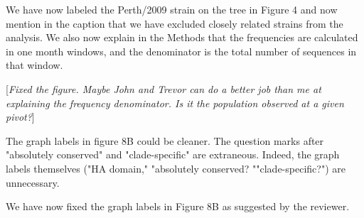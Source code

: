 \documentclass[11pt, oneside]{article}   	%
\newcommand{\comment}[1]{{\color{red}[\textsl{#1}]}}
\newcommand{\response}[1]{{\color{black}#1}}
\begin{document}
\response{We have now labeled the Perth/2009 strain on the tree in Figure 4 and now mention in the caption that we have excluded closely related strains from the analysis.
We also now explain in the Methods that the frequencies are calculated in one month windows, and the denominator is the total number of sequences in that window.
}

\comment{Fixed the figure. Maybe John and Trevor can do a better job than me at explaining the frequency denominator. Is it the population observed at a given pivot?}

The graph labels in figure 8B could be cleaner. The question marks after "absolutely conserved" and "clade-specific" are extraneous. Indeed, the graph labels themselves ("HA domain," "absolutely conserved? ""clade-specific?") are unnecessary. 

\response{We have now fixed the graph labels in Figure 8B as suggested by the reviewer.}
\end{document}

